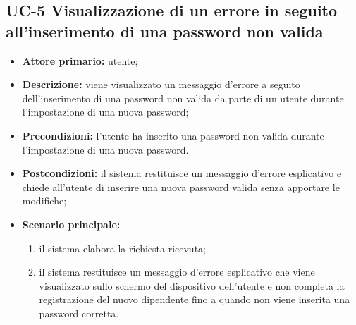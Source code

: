 \subsection{UC-5 Visualizzazione di un errore in seguito all'inserimento di una password non valida}
\begin{itemize}
	\item \textbf{Attore primario:} utente;

	\item \textbf{Descrizione:} viene visualizzato un messaggio d'errore a seguito dell'inserimento di una password non valida da parte di un utente durante l'impostazione di una nuova password;

	\item \textbf{Precondizioni:} l'utente ha inserito una password non valida durante l'impostazione di una nuova password.

	\item \textbf{Postcondizioni:} il sistema restituisce un messaggio d'errore esplicativo e chiede all'utente di inserire una nuova password valida senza apportare le modifiche;

	\item \textbf{Scenario principale:}
	      \begin{enumerate}
		      \item il sistema elabora la richiesta ricevuta;
		      \item il sistema restituisce un messaggio d'errore esplicativo che viene visualizzato sullo schermo del dispositivo dell'utente e non completa la registrazione del nuovo dipendente fino a quando non viene inserita una password corretta.
	      \end{enumerate}
\end{itemize}
